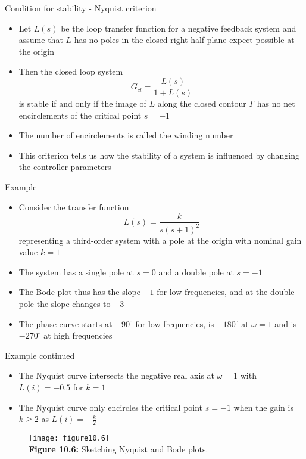 \documentclass{beamer-control}
\begin{document}
\begin{frame}{Condition for stability - Nyquist criterion}
\begin{itemize}
\item Let $L(s)$ be the loop transfer function for a negative feedback system and assume that $L$ has no poles in the closed right half-plane expect possible at the origin
\item Then the closed loop system \[G_{cl}=\frac{L(s)}{1+L(s)}\]
is stable if and only if the image of $L$ along the closed contour $\Gamma$ has no net encirclements of the critical point $s=-1$
\item The number of encirclements is called the winding number
\item This criterion tells us how the stability of a system is influenced by changing the controller parameters
\end{itemize}
\end{frame}


\begin{frame}{Example}
\begin{itemize}
	\item Consider the transfer function 
	\[L(s) = \frac{k}{s(s+1)^2}\] 
	representing a third-order system with a pole at the origin with nominal gain value $k=1$
	\item The system has a single pole at $s=0$ and a double pole at $s=-1$
	\item The Bode plot thus has the slope $-1$ for low frequencies, and at the double pole the slope changes to $-3$
	\item The phase curve starts at $-90^\circ$ for low frequencies, is $-180^\circ$ at $\omega=1$ and is $-270^\circ$ at high frequencies
\end{itemize}
\end{frame}


\begin{frame}{Example continued}
	\begin{itemize}
		\item The Nyquist curve intersects the negative real axis at $\omega=1$ with $L(i)=-0.5$ for $k=1$
		\item The Nyquist curve only encircles the critical point $s=-1$ when the gain is $k\geq 2$ as $L(i)=-\tfrac{k}{2}$
	\end{itemize}
\begin{figure}
	\centering
	\texttt{[image: figure10.6]}
	\\
	\textbf{Figure 10.6:} Sketching Nyquist and Bode plots.
\end{figure}
\end{frame}

\SUMMARYFRAME
\FINALE
\end{document}
